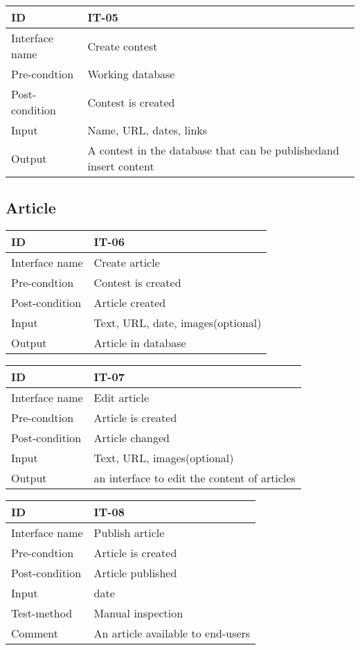 \begin{center}
\begin{tabular}{|l|p{}|}
\hline
ID & IT-05\\\hline
Interface name & Create contest\\\hline
Pre-condtion & Working database\\\hline
Post-condition & Contest is created\\\hline
Input & Name, URL, dates, links\\\hline
Output & A contest in the database that can be publishedand insert
content\\\hline
\end{tabular}
\end{center}


\subsection{Article}

\begin{center}
\begin{tabular}{|l|p{}|}
\hline
ID & IT-06\\\hline
Interface name & Create article\\\hline
Pre-condtion & Contest is created\\\hline
Post-condition & Article created\\\hline
Input & Text, URL, date, images(optional)\\\hline
Output & Article in database\\\hline
\end{tabular}
\end{center}

\begin{center}
\begin{tabular}{|l|p{}|}
\hline
ID & IT-07\\\hline
Interface name & Edit article\\\hline
Pre-condtion & Article is created\\\hline
Post-condition & Article changed\\\hline
Input & Text, URL, images(optional)\\\hline
Output & an interface to edit the content of
articles\\\hline
\end{tabular}
\end{center}

\begin{center}
\begin{tabular}{|l|p{}|}
\hline
ID & IT-08\\\hline
Interface name & Publish article\\\hline
Pre-condtion & Article is created\\\hline
Post-condition & Article published\\\hline
Input & date\\\hline
Test-method & Manual inspection\\\hline
Comment & An article available to end-users\\\hline
\end{tabular}
\end{center}

